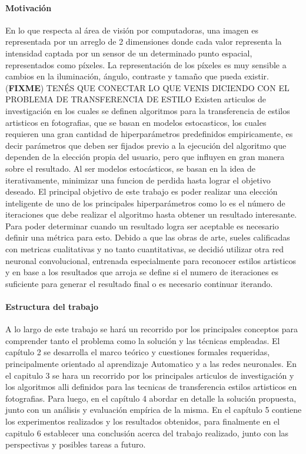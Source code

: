 \documentclass[a4paper,11pt,spanish]{book}
\newcommand*{\FIXME}[1]{{(\textbf{FIXME}) {#1}}}
\begin{document}
  \paragraph{Motivación}
    En lo que respecta al área de visión por computadoras, una imagen es representada por un arreglo de 2 dimensiones donde cada valor representa la intensidad captada por un sensor 
    de un determinado punto espacial, representados como píxeles. La representación de los píxeles es muy sensible a cambios en la iluminación, ángulo, contraste y tamaño que pueda existir.
    \FIXME{TENÉS QUE CONECTAR LO QUE VENIS DICIENDO CON EL PROBLEMA DE TRANSFERENCIA DE ESTILO}
    Existen articulos de investigación en los cuales se definen algoritmos para la transferencia de estilos artisticos en fotografias, que se basan en modelos estocasticos, 
    los cuales requieren una gran cantidad de hiperparámetros predefinidos empiricamente, es decir parámetros que deben ser fijados previo a la ejecución del algoritmo que dependen 
    de la elección propia del usuario, pero que influyen en gran manera sobre el resultado.
    Al ser modelos estocásticos, se basan en la idea de iterativamente, minimizar una funcion de perdida hasta lograr el objetivo deseado. 
    El principal objetivo de este trabajo es poder realizar una elección inteligente de uno de los principales hiperparámetros como lo es el número de iteraciones 
    que debe realizar el algoritmo hasta obtener un resultado interesante.
    Para poder determinar cuando un resultado logra ser aceptable es necesario definir una métrica para esto.
    Debido a que las obras de arte, sueles calificadas con metricas cualitativas y no tanto cuantitativas, se decidió utilizar otra red neuronal convolucional, 
    entrenada especialmente para reconocer estilos artisticos y en base a los resultados que arroja se define si el numero de iteraciones es suficiente para generar el resultado final 
    o es necesario continuar iterando.
  
  \paragraph{Estructura del trabajo}
    A lo largo de este trabajo se hará un recorrido por los principales conceptos para comprender tanto el problema como la solución y las técnicas empleadas.
    El capítulo 2 se desarrolla el marco teórico y cuestiones formales requeridas, principalmente orientado al aprendizaje Automatico y a las redes neuronales.
    En el capitulo 3 se hara un recorrido por los principales articulos de investigación y los algoritmos alli definidos para las tecnicas de transferencia estilos artisticos en fotografias.
    Para luego, en el capítulo 4 abordar en detalle la solución propuesta, junto con un análisis y evaluación empírica de la misma.
    En el capítulo 5 contiene los experimentos realizados y los resultados obtenidos, para finalmente en el capitulo 6 establecer una conclusión acerca del trabajo realizado, 
    junto con las perspectivas y posibles tareas a futuro.
\end{document}
